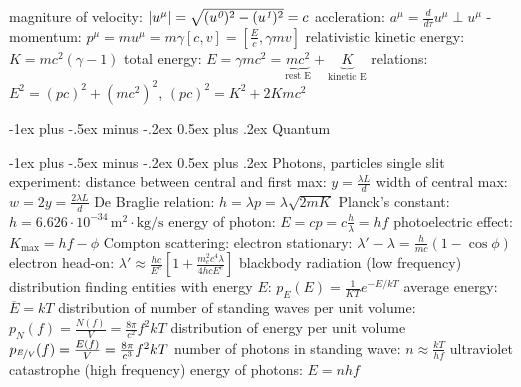 \documentclass[10pt,landscape]{article}
\makeatletter
\renewcommand{\section}{\@startsection{section}{1}{0mm}%
                                {-1ex plus -.5ex minus -.2ex}%
                                {0.5ex plus .2ex}%
                                {\normalfont\large\bfseries}}
\renewcommand{\subsection}{\@startsection{subsection}{2}{0mm}%
                                {-1ex plus -.5ex minus -.2ex}%
                                {0.5ex plus .2ex}%
                                {\normalfont\normalsize\bfseries}}
\newcommand{\spc}{\hspace*{1em}}
\makeatother
\begin{document}
\begin{multicols*}{3}
\newline
\spc magniture of velocity: $|u^{\mu}|=\sqrt{(u^{\emph{0}})^2-(u^{\emph{1}})^2}=c$
\newline
accleration: $a^{\mu}=\frac{d}{d\tau}u^{\mu}\perp u^{\mu}$
-momentum: $p^{\mu}=mu^{\mu}=m\gamma[c,v]=[\frac{E}{c},\gamma mv]$
\newline
relativistic kinetic energy: $K=mc^2(\gamma -1)$
\newline
\spc total energy: $E=\gamma mc^2=\underbrace{mc^2}_{\textrm{rest E}}+\underbrace{K}_{\textrm{kinetic E}}$
\newline
\spc relations: $E^2=(pc)^2+(mc^2)^2$, $(pc)^2=K^2+2Kmc^2$

\section{Quantum}

\subsection{Photons, particles}
single slit experiment: 
\newline
\spc distance between central and first max: $y=\frac{\lambda L}{d}$
\newline
\spc width of central max: $w=2y=\frac{2\lambda L}{d}$
\newline
De Braglie relation: $h=\lambda p=\lambda \sqrt{2mK}$
\newline
Planck's constant: $h=6.626\cdot 10^{-34}\,\mathrm{m}^2\cdot\textrm{kg}/\textrm{s}$
\newline
energy of photon: $E=cp=c\frac{h}{\lambda}=hf$
\newline
photoelectric effect: $K_{\mathrm{max}}=hf-\phi$
\newline
Compton scattering:
\newline
\spc electron stationary: $\lambda '-\lambda=\frac{h}{mc}(1-\cos\phi)$
\newline
\spc electron head-on: $\lambda '\approx \frac{hc}{E^e}\left [ 1+\frac{m_e^2c^4\lambda}{4hcE^e} \right ]$
\newpage
blackbody radiation (low frequency)
\newline
\spc distribution finding entities with energy $E$:
\newline
\spc \spc$p_E(E)=\frac{1}{KT}e^{-E/kT}$
\newline
\spc \spc average energy: $\overline{E}=kT$
\newline
\spc distribution of number of standing waves per unit volume:
\newline
\spc \spc $p_N(f)=\frac{N(f)}{V}=\frac{8\pi}{c^2}f^2kT$
\newline
\spc distribution of energy per unit volume
\newline
\spc \spc $p_{\nicefrac{E}{V}}(f)=\frac{E(f)}{V}=\frac{8\pi}{c^3}f^2kT$
\newline
\spc number of photons in standing wave: $n\approx \frac{kT}{hf}$
\newline
ultraviolet catastrophe (high frequency)
\newline
\spc energy of photons: $E=nhf$




\end{multicols*}
\end{document}

